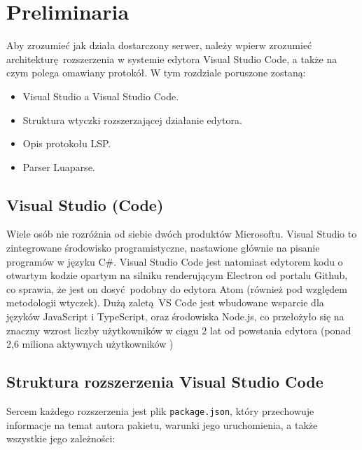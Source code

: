 \chapter{Preliminaria}
Aby zrozumieć jak działa dostarczony serwer, należy wpierw zrozumieć architekturę rozszerzenia w systemie edytora Visual Studio Code, a także na czym polega omawiany protokół. W tym rozdziale poruszone zostaną:

\begin{itemize}
    \item Visual Studio a Visual Studio Code.
    \item Struktura wtyczki rozszerzającej działanie edytora.
    \item Opis protokołu LSP.
    \item Parser Luaparse.
\end{itemize}

\section{Visual Studio (Code)}
Wiele osób nie rozróżnia od siebie dwóch produktów Microsoftu. Visual Studio to zintegrowane środowisko programistyczne, nastawione głównie na pisanie programów w języku C\#. Visual Studio Code jest natomiast edytorem kodu o otwartym kodzie opartym na silniku renderującym Electron od portalu Github, co sprawia, że jest on dosyć podobny do edytora Atom (również pod względem metodologii wtyczek). Dużą zaletą VS Code jest wbudowane wsparcie dla języków JavaScript i TypeScript, oraz środowiska Node.js, co przełożyło się na znaczny wzrost liczby użytkowników w ciągu 2 lat od powstania edytora (ponad 2,6 miliona aktywnych użytkowników \cite{connect})

\section{Struktura rozszerzenia Visual Studio Code}
Sercem każdego rozszerzenia jest plik \texttt{package.json}, który przechowuje informacje na temat autora pakietu, warunki jego uruchomienia, a także wszystkie jego zależności:

